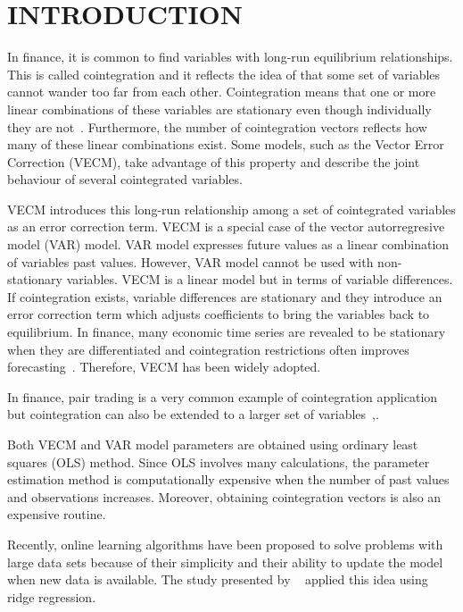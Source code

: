 \section{\uppercase{Introduction}}
\label{sec:introduction}
\noindent In finance, it is common to find variables with long-run equilibrium
relationships. This is called cointegration and it reflects the idea of that
some set of variables cannot wander too far from each other. Cointegration means
that one or more linear combinations of these variables are stationary even
though individually they are not~\cite{engle87}. Furthermore, the number of
cointegration vectors reflects how many of these linear combinations exist. Some
models, such as the Vector Error Correction (VECM), take advantage of this property
and describe the joint behaviour of several cointegrated variables.

VECM introduces this long-run relationship
among a set of cointegrated variables as an error correction term. VECM is a
special case of the vector autorregresive model (VAR) model. VAR model
expresses future values as a linear combination of variables past values.
However, VAR model cannot be used with non-stationary variables. VECM is a
linear model but in terms of variable differences. If cointegration exists,
variable differences are stationary and they introduce an error correction term
which adjusts coefficients to bring the variables back to equilibrium. In
finance, many economic time series are revealed to be stationary when they are
differentiated and cointegration restrictions often improves
forecasting~\cite{duy1998}. Therefore, VECM has been widely adopted.

In finance, pair trading is a very common example of cointegration
application~\cite{herlemont2003} but cointegration can also be extended to a
larger set of variables~\cite{mukherjee1995},\cite{engle2004}.

Both VECM and VAR model parameters are obtained using ordinary least squares
(OLS) method. Since OLS involves many calculations, the parameter estimation
method is computationally expensive when the number of past values and
observations increases. Moreover, obtaining cointegration vectors is also an
expensive routine.

Recently, online learning algorithms have been proposed to solve problems with
large data sets because of their simplicity and their ability to update the
model when new data is available. The study presented by ~\cite{arce+salinas2012}
applied this idea using ridge regression.

